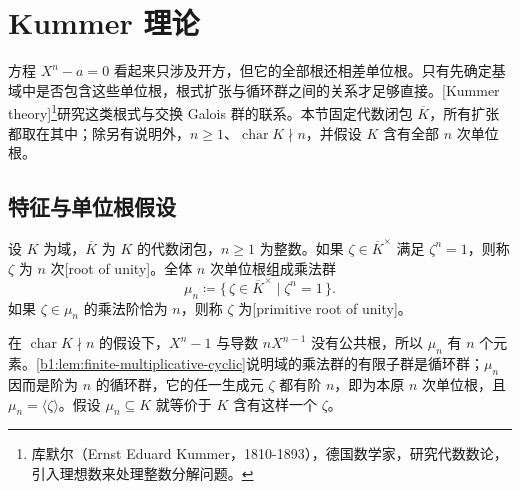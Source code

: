 
\section{Kummer 理论}
\label{b1:sec:2003}

方程 \(X^n-a=0\) 看起来只涉及开方，但它的全部根还相差单位根。只有先确定基域中是否包含这些单位根，根式扩张与循环群之间的关系才足够直接。[Kummer theory]\footnote{库默尔（Ernst Eduard Kummer，1810-1893），德国数学家，研究代数数论，引入理想数来处理整数分解问题。}研究这类根式与交换 Galois 群的联系。本节固定代数闭包 \(\overline K\)，所有扩张都取在其中；除另有说明外，\(n\geq1\)、\(\operatorname{char}K\nmid n\)，并假设 \(K\) 含有全部 \(n\) 次单位根。

%
%

\subsection{特征与单位根假设}
\label{b1:subsec:2003:01}

\begin{definition}\label{b1:def:roots-of-unity}
	设 \(K\) 为域，\(\overline K\) 为 \(K\) 的代数闭包，\(n\geq1\) 为整数。如果 \(\zeta\in\overline K^\times\) 满足 \(\zeta^n=1\)，则称 \(\zeta\) 为 \(n\) 次[root of unity]。全体 \(n\) 次单位根组成乘法群
	\[
		\mu_n\coloneqq\{\,\zeta\in\overline K^\times\mid\zeta^n=1\,\}.
	\]
	如果 \(\zeta\in\mu_n\) 的乘法阶恰为 \(n\)，则称 \(\zeta\) 为[primitive root of unity]。
\end{definition}

在 \(\operatorname{char}K\nmid n\) 的假设下，\(X^n-1\) 与导数 \(nX^{n-1}\) 没有公共根，所以 \(\mu_n\) 有 \(n\) 个元素。\cref{b1:lem:finite-multiplicative-cyclic}说明域的乘法群的有限子群是循环群；\(\mu_n\) 因而是阶为 \(n\) 的循环群，它的任一生成元 \(\zeta\) 都有阶 \(n\)，即为本原 \(n\) 次单位根，且 \(\mu_n=\langle\zeta\rangle\)。假设 \(\mu_n\subseteq K\) 就等价于 \(K\) 含有这样一个 \(\zeta\)。

